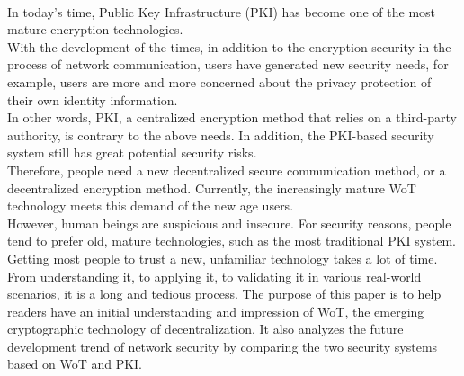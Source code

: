 \\
In today's time, Public Key Infrastructure (PKI) has become one of the most mature 
encryption technologies\cite{b5}.
\\
With the development of the times, in addition to the encryption security in the 
process of network communication, users have generated new security needs, for example, 
users are more and more concerned about the privacy protection of their own identity information.
\\
In other words, PKI, a centralized encryption method that relies on a third-party 
authority, is contrary to the above needs. In addition, the PKI-based security system still has 
great potential security risks\cite{b6}.
\\
Therefore, people need a new decentralized secure communication method, or a decentralized 
encryption method. Currently, the increasingly mature WoT technology meets this demand of 
the new age users\cite{b14}.
\\
However, human beings are suspicious and insecure. For security reasons, people tend 
to prefer old, mature technologies, such as the most traditional PKI system. Getting 
most people to trust a new, unfamiliar technology takes a lot of time. From understanding 
it, to applying it, to validating it in various real-world scenarios, it is a long and 
tedious process. The purpose of this paper is to help readers have an initial 
understanding and impression of WoT, the emerging cryptographic technology of decentralization. 
It also analyzes the future development trend of network security by comparing the two 
security systems based on WoT and PKI.